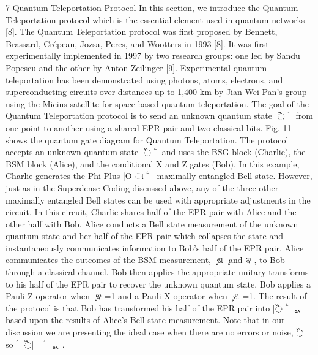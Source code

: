 7 Quantum Teleportation Protocol In this section, we introduce the Quantum Teleportation protocol which is the essential element used in quantum networks [8]. The Quantum Teleportation protocol was first proposed by Bennett, Brassard, Crépeau, Jozsa, Peres, and Wootters in 1993 [8]. It was first experimentally implemented in 1997 by two research groups: one led by Sandu Popescu and the other by Anton Zeilinger [9]. Experimental quantum teleportation has been demonstrated using photons, atoms, electrons, and superconducting circuits over distances up to 1,400 km by Jian-Wei Pan’s group using the Micius satellite for space-based quantum teleportation. The goal of the Quantum Teleportation protocol is to send an unknown quantum state |߰ ۧ ஼ from one point to another using a shared EPR pair and two classical bits. Fig. 11 shows the quantum gate diagram for Quantum Teleportation. The protocol accepts an unknown quantum state |߰ ۧ ஼ and uses the BSG block (Charlie), the BSM block (Alice), and the conditional X and Z gates (Bob). In this example, Charlie generates the Phi Plus |Ȱ ା ۧ ஺஻ maximally entangled Bell state. However, just as in the Superdense Coding discussed above, any of the three other maximally entangled Bell states can be used with appropriate adjustments in the circuit. In this circuit, Charlie shares half of the EPR pair with Alice and the other half with Bob. Alice conducts a Bell state measurement of the unknown quantum state and her half of the EPR pair which collapses the state and instantaneously communicates information to Bob’s half of the EPR pair. Alice communicates the outcomes of the BSM measurement, ܾ ଶ ܾ and ଵ , to Bob through a classical channel. Bob then applies the appropriate unitary transforms to his half of the EPR pair to recover the unknown quantum state. Bob applies a Pauli-Z operator when ܾ ଵ =1 and a Pauli-X operator when ܾ ଶ =1. The result of the protocol is that Bob has transformed his half of the EPR pair into |߰ ۧ ஼ ᇱ based upon the results of Alice’s Bell state measurement. Note that in our discussion we are presenting the ideal case when there are no errors or noise, ߰| so ۧ ஼ ߰|= ۧ ஼ ᇱ .

